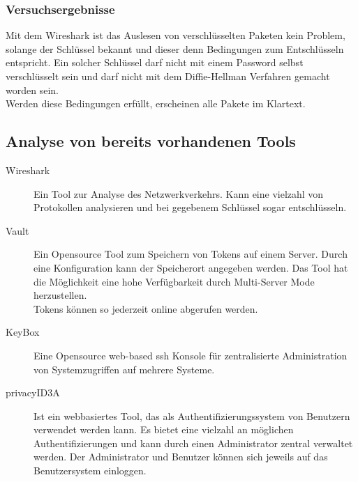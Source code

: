 	\subsubsection{Versuchsergebnisse}
	Mit dem Wireshark ist das Auslesen von verschlüsselten Paketen kein Problem, solange der Schlüssel bekannt und dieser denn Bedingungen zum Entschlüsseln entspricht. Ein solcher Schlüssel darf nicht mit einem Password selbst verschlüsselt sein und darf nicht mit dem Diffie-Hellman Verfahren gemacht worden sein.\\
	Werden diese Bedingungen erfüllt, erscheinen alle Pakete im Klartext. 
	
	\subsection{Analyse von bereits vorhandenen Tools} %
	\begin{description}
		\item[Wireshark] Ein Tool zur Analyse des Netzwerkverkehrs. Kann eine vielzahl von Protokollen analysieren und bei gegebenem Schlüssel sogar entschlüsseln.
		\item[Vault] Ein Opensource Tool zum Speichern von Tokens auf einem Server. Durch eine Konfiguration kann der Speicherort angegeben werden. Das Tool hat die Möglichkeit eine hohe Verfügbarkeit durch Multi-Server Mode herzustellen.\\
		Tokens können so jederzeit online abgerufen werden.
		\item[KeyBox] Eine Opensource web-based ssh Konsole für zentralisierte Administration von Systemzugriffen auf mehrere Systeme.
		\item[privacyID3A] Ist ein webbasiertes Tool, das als Authentifizierungssystem von Benutzern verwendet werden kann. Es bietet eine vielzahl an möglichen Authentifizierungen und kann durch einen Administrator zentral verwaltet werden. Der Administrator und Benutzer können sich jeweils auf das Benutzersystem einloggen.
	\end{description}